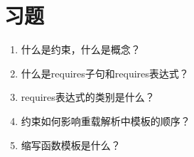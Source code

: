 \section{习题}
\begin{enumerate}
\item
什么是约束，什么是概念？

\item
什么是requires子句和requires表达式？

\item
requires表达式的类别是什么？

\item
约束如何影响重载解析中模板的顺序？

\item
缩写函数模板是什么？
\end{enumerate}